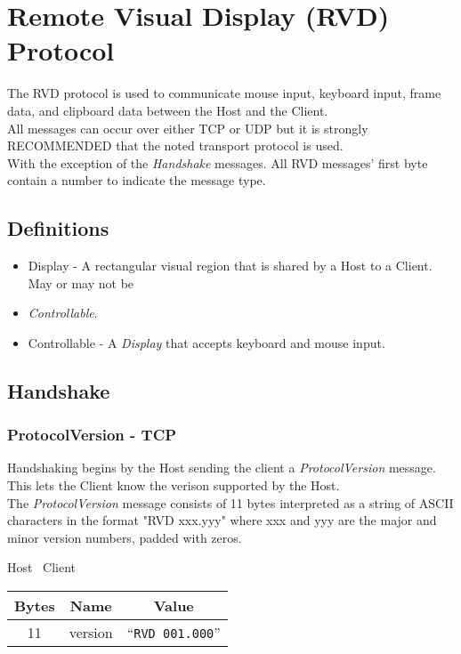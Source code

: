\documentclass{article}
\begin{document}
    \section{Remote Visual Display (RVD) Protocol}

    The RVD protocol is used to communicate mouse input, keyboard input, frame data, and clipboard data between the
    Host and the Client.\\

    All messages can occur over either TCP or UDP but it is strongly RECOMMENDED that the noted transport protocol is
    used.\\

    With the exception of the \emph{Handshake} messages. All RVD messages' first byte contain a number to indicate
    the message type.

    \subsection{Definitions}

    \begin{itemize}
        \item Display - A rectangular visual region that is shared by a Host to a Client. May or may not be
        \item \emph{Controllable}.
        \item Controllable - A \emph{Display} that accepts keyboard and mouse input.
    \end{itemize}

    \subsection{Handshake}

    \subsubsection{ProtocolVersion - TCP}
    Handshaking begins by the Host sending the client a \emph{ProtocolVersion} message. This lets the Client know the
    verison supported by the Host.\\

    The \emph{ProtocolVersion} message consists of 11 bytes interpreted as a string of ASCII characters in the format
    "RVD xxx.yyy" where xxx and yyy are the major and minor version numbers, padded with zeros.

    \begin{center}
        Host \textrightarrow\ Client\\
        \begin{tabular}{|c|c|c|}
            \hline
            \textbf{Bytes} & \textbf{Name} & \textbf{Value}           \\
            \hline
            11             & version       & ``\texttt{RVD 001.000}'' \\
            \hline
        \end{tabular}
    \end{center}
\end{document}
